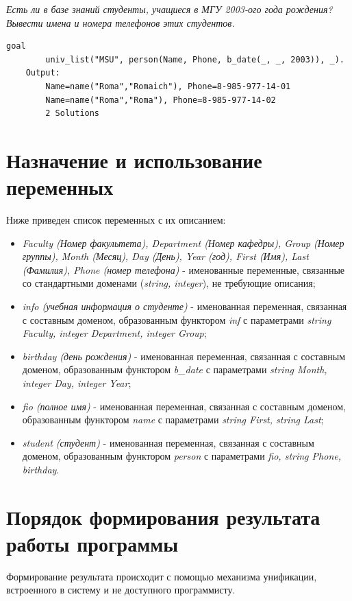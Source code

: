 \documentclass[a4paper,12pt]{article}
\begin{document}
	\textit{Есть ли в базе знаний студенты, учащиеся в МГУ 2003-ого года рождения? Вывести имена и номера телефонов этих студентов.}
	\begin{lstlisting}[label = lst_qw_4, caption = Пример 4]
	goal
		univ_list("MSU", person(Name, Phone, b_date(_, _, 2003)), _).
	Output:
		Name=name("Roma","Romaich"), Phone=8-985-977-14-01
		Name=name("Roma","Roma"), Phone=8-985-977-14-02
		2 Solutions
	\end{lstlisting}
	
	\section{Назначение и использование переменных}
	
	Ниже приведен список переменных с их описанием:
	\begin{itemize}
		\item \textit{Faculty (Номер факультета), Department (Номер кафедры), Group (Номер группы), Month (Месяц), Day (День), Year (год), First (Имя), Last (Фамилия), Phone (номер телефона)} - именованные переменные, связанные со стандартными доменами (\textit{string, integer}), не требующие описания;
		\item \textit{info (учебная информация о студенте)} - именованная переменная, связанная с составным доменом, образованным функтором \textit{inf} с параметрами \textit{string Faculty, integer Department, integer Group};
		\item \textit{birthday (день рождения)} - именованная переменная, связанная с составным доменом, образованным функтором \textit{b\_date} с параметрами \textit{string Month, integer Day, integer Year};
		\item \textit{fio (полное имя)} - именованная переменная, связанная с составным доменом, образованным функтором \textit{name} с параметрами \textit{string First, string Last};
		\item \textit{student (студент)} -  именованная переменная, связанная с составным доменом, образованным функтором \textit{person} с параметрами \textit{fio, string Phone, birthday}.
	\end{itemize}
	
	\section{Порядок формирования результата работы программы}
	Формирование результата происходит с помощью механизма унификации, встроенного в систему и не доступного программисту.
	
\end{document}
